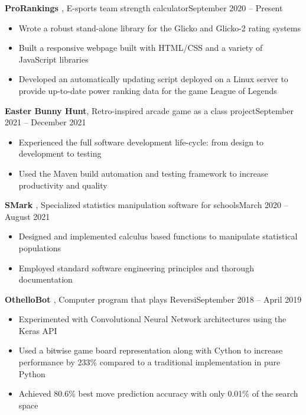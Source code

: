 \documentclass{article}
\newcommand{\entrytitle}[3]{\vspace{0.5em}\textbf{#1}, #2\hfill #3}
\newenvironment{entrybody}{\begin{itemize}[itemsep=0.3em]}{\end{itemize}}
\begin{document}
\entrytitle{ProRankings \href{https://github.com/xtevenx/ProRankings}{\faGithub}} %
    {E-sports team strength calculator}{September 2020 – Present}
\begin{entrybody}
\item Wrote a robust stand-alone library for the Glicko and Glicko-2 rating systems
\item Built a responsive webpage built with HTML/CSS and a variety of JavaScript libraries
\item
    Developed an automatically updating script deployed on a Linux server to provide up-to-date
    power ranking data for the game League of Legends
\end{entrybody}

\entrytitle{Easter Bunny Hunt} %
    {Retro-inspired arcade game as a class project}{September 2021 – December 2021}
\begin{entrybody}
\item Experienced the full software development life-cycle: from design to development to testing
\item Used the Maven build automation and testing framework to increase productivity and quality
\end{entrybody}

\entrytitle{SMark \href{https://github.com/xtevenx/SMark}{\faGithub}} %
    {Specialized statistics manipulation software for schools}{March 2020 – August 2021}
\begin{entrybody}
\item Designed and implemented calculus based functions to manipulate statistical populations
\item Employed standard software engineering principles and thorough documentation
\end{entrybody}

\entrytitle{OthelloBot \href{https://github.com/xtevenx/othello-bot}{\faGithub}} %
    {Computer program that plays Reversi}{September 2018 – April 2019}
\begin{entrybody}
\item Experimented with Convolutional Neural Network architectures using the Keras API
\item  %
    Used a bitwise game board representation along with Cython to increase performance by 233\%
    compared to a traditional implementation in pure Python
\item  %
    Achieved 80.6\% best move prediction accuracy with only 0.01\% of the search space
\end{entrybody}
\end{document}
